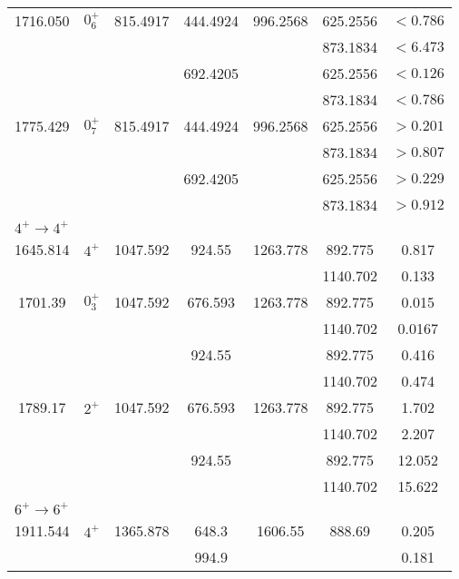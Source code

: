 \begin{longtable}{c|c|c|c|c|c|c}
        1716.050 & $0^+_6$ & 815.4917 & 444.4924 & 996.2568 & 625.2556 & $<0.786$  \\
         & &  &  &  & 873.1834 & $<6.473$  \\
         & &  & 692.4205 &  & 625.2556 & $<0.126$  \\
         & &  &  &  & 873.1834 & $<0.786$  \\ \hline
        1775.429 & $0^+_7$ & 815.4917 & 444.4924 & 996.2568 & 625.2556 & $>0.201$  \\
         & &  &  &  & 873.1834 & $>0.807$  \\
         & &  & 692.4205 &  & 625.2556 & $>0.229$  \\
         & &  &  &  & 873.1834 & $>0.912$  \\ \hline
        \multicolumn{7}{l}{$4^+\rightarrow 4^+$} 	\\ \hline
        1645.814 & $4^+$ & 1047.592 & 924.55 & 1263.778 & 892.775 &  0.817  \\ 
        & &  &  &  & 1140.702 & 0.133  \\ \hline
        1701.39 & $0^+_3$ & 1047.592 & 676.593 & 1263.778 & 892.775 & 0.015   \\
        & &  &  &  & 1140.702 & 0.0167  \\
        & &  & 924.55 &  & 892.775 & 0.416   \\
        & &  &  &  & 1140.702 & 0.474  \\ \hline
        1789.17 & $2^+$ & 1047.592 & 676.593 & 1263.778 & 892.775 & 1.702   \\
        & &  &  &  & 1140.702 & 2.207  \\
        & &  & 924.55 &  & 892.775 & 12.052   \\
        & &  &  &  & 1140.702 & 15.622  \\ \hline
        \multicolumn{7}{l}{$6^+\rightarrow 6^+$} 	\\ \hline
        1911.544 & $4^+$ & 1365.878 & 648.3 & 1606.55 & 888.69 & 0.205 \\
        & &  &  994.9  &  &  &  0.181   \\
        \bottomrule
    \end{longtable}
